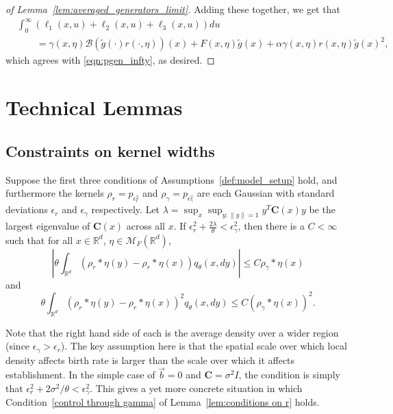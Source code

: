 \documentclass[EJP]{ejpecp} %
\newcommand{\IR}{\mathbb R}
\newcommand{\DG}{\mathcal{B}}  %
\newcommand{\meanq}{\vec b}    %
\newcommand{\covq}{\mathbf{C}}     %
\newcommand{\kernel}{\rho}  %
\newcommand{\smooth}[1]{\kernel_{#1} \! * \!}  %
\newcommand{\measures}{\mathcal{M}_F(\IR^d)} %
\begin{document}
\begin{proof}[of Lemma~\ref{lem:averaged_generators_limit}]
Adding these together, we get that
\begin{align*}
    &
    \int_0^\infty (\ell_1(x,u) + \ell_2(x,u) + \ell_3(x,u)) du
    \\ &\qquad=
    \gamma(x,\eta) \DG(\widetilde{g}(\cdot)r(\cdot,\eta))(x)
    + F(x,\eta) \widetilde{g}(x) 
    + \alpha \gamma(x,\eta) r(x,\eta) \widetilde{g}(x)^2 ,
\end{align*}
which agrees with \eqref{eqn:pgen_infty}, as desired.
\end{proof}


\section{Technical Lemmas}

\subsection{Constraints on kernel widths}

\begin{lemma}
    \label{lem:gamma_bound}
    Suppose the first three conditions of Assumptions~\ref{def:model_setup} hold,
    and furthermore the kernels $\rho_r = p_{\epsilon_r^2}$ and $\rho_\gamma = p_{\epsilon_\gamma^2}$
    are each Gaussian with standard deviations $\epsilon_r$ and $\epsilon_\gamma$ respectively.
    Let $\lambda = \sup_x \sup_{y : \|y\| = 1} y^T \covq(x) y$ be the largest eigenvalue of $\covq(x)$
    across all $x$.
    If $\epsilon_{r}^2 + \frac{2\lambda}{\theta} < \epsilon_{\gamma}^2$, then 
    there is a $C < \infty$ such that
    for all $x\in\IR^d$, $\eta\in\measures$,
    \begin{equation}
        \label{eqn:first_moment_rho}
        \left|\theta \int_{\IR^d}
            ( \smooth{r} \eta(y)-\smooth{r} \eta(x) )
        q_\theta(x,dy)\right|
        \leq C \smooth{\gamma} \eta(x)
    \end{equation}
    and
    \begin{equation}
        \label{eqn:second_moment_rho}
        \theta \int_{\IR^d}
                \left( \smooth{r} \eta(y) - \smooth{r} \eta(x) \right)^2
        q_\theta(x,dy)
        \leq C \left(\smooth{\gamma}\eta(x) \right)^2 .
    \end{equation}
\end{lemma}

Note that the right hand side of each is the average density
over a wider region (since $\epsilon_\gamma > \epsilon_r$).
The key assumption here 
is that the spatial scale over which local density affects birth rate
is larger than the scale over which it affects establishment.
In the simple case of $\meanq = 0$ and $\covq = \sigma^2 I$,
the condition is simply that $\epsilon_r^2 + 2\sigma^2 / \theta < \epsilon_\gamma^2$.
This gives a yet more concrete situation in which 
Condition~\ref{control through gamma} of Lemma~\ref{lem:conditions on r} holds.
\end{document}
